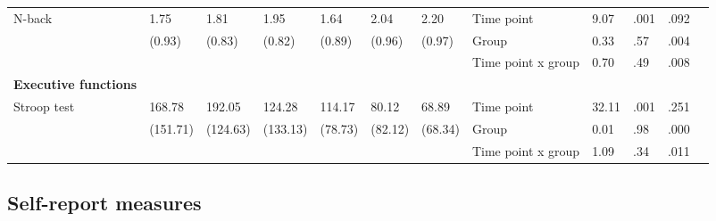 \documentclass[authordate, empirical]{jote-new-article}
\begin{document}
\begin{table}[t]
\begin{fullwidth}
{\begin{tabular}{@{} l l l l l l l | l l l l l @{}}
        \hline N-back                                  & 1.75                                          & 1.81                 & 1.95                 & 1.64          & 2.04                                  & 2.20    & Time point         & 9.07  & .001 & .092   \\
                                                       & (0.93)                                        & (0.83)               & (0.82)               & (0.89)        & (0.96)                                & (0.97)  & Group              & 0.33  & .57  & .004   \\
                                                       &                                               &                      &                      &               &                                       &         & Time point x group & 0.70  & .49  & .008   \\

        \textbf{Executive functions}                   &                                               &                      &                      &               &                                       &         &                    &       &      &      & \\

        \hline Stroop test                             & 168.78                                        & 192.05               & 124.28               & 114.17        & 80.12                                 & 68.89   & Time point         & 32.11 & .001 & .251   \\
                                                       & (151.71)                                      & (124.63)             & (133.13)             & (78.73)       & (82.12)                               & (68.34) & Group              & 0.01  & .98  & .000   \\
                                                       &                                               &                      &                      &               &                                       &         & Time point x group & 1.09  & .34  & .011   \\
        \bottomrule
      \end{tabular}}
  \end{fullwidth}
\end{table}




\subsection{Self-report measures}
\end{document}
